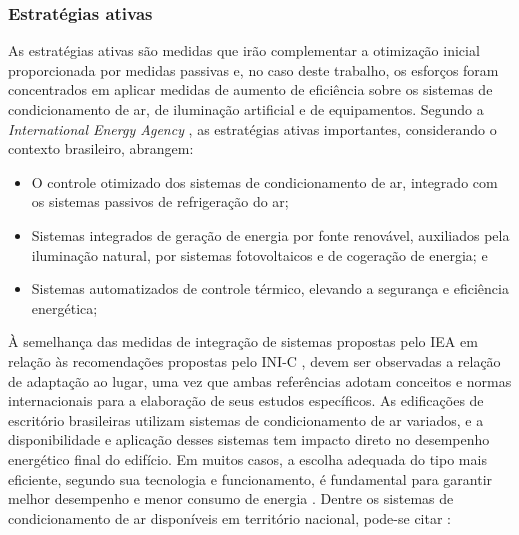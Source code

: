 \subsubsection{Estratégias ativas}
As estratégias ativas são medidas que irão complementar a otimização inicial proporcionada por medidas passivas e, no caso deste trabalho, os esforços foram concentrados em aplicar medidas de aumento de eficiência sobre os sistemas de condicionamento de ar, de iluminação artificial e de equipamentos. Segundo a \textit{International Energy Agency} \citeyear{InternationalEnergyAgency-IEA2014}, as estratégias ativas importantes, considerando o contexto brasileiro, abrangem:
    \begin{itemize}
        \item O controle otimizado dos sistemas de condicionamento de ar, integrado com os sistemas passivos de refrigeração do ar;
        \item Sistemas integrados de geração de energia por fonte renovável, auxiliados pela iluminação natural, por sistemas fotovoltaicos e de cogeração de energia; e
        \item Sistemas automatizados de controle térmico, elevando a segurança e eficiência energética;
    \end{itemize}
À semelhança das medidas de integração de sistemas propostas pelo IEA em relação às recomendações propostas pelo INI-C \cite{InstitutoNacionaldeMetrologiaNormalizacaoeQualidadeIndustrial-INMETRO2018}, devem ser observadas a relação de adaptação ao lugar, uma vez que ambas referências adotam conceitos e normas internacionais para a elaboração de seus estudos específicos.\vspace*{0.3cm} \newline
As edificações de escritório brasileiras utilizam sistemas de condicionamento de ar variados, e a disponibilidade e aplicação desses sistemas tem impacto direto no desempenho energético final do edifício. Em muitos casos, a escolha adequada do tipo mais eficiente, segundo sua tecnologia e funcionamento, é fundamental para garantir melhor desempenho e menor consumo de energia \cite{Kamal2019,Shin2019}. Dentre os sistemas de condicionamento de ar disponíveis em território nacional, pode-se citar \cite{ConselhoBrasileirodeConstrucaoSustentavel-CBCS2015}:

